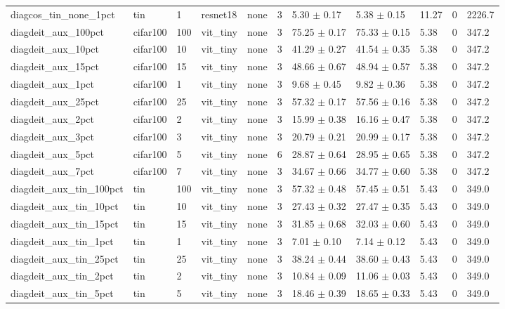 \begin{tabular}{lllllllllll}
diagcos_tin_none_1pct & tin & 1 & resnet18 & none & 3 & 5.30 $\pm$ 0.17 & 5.38 $\pm$ 0.15 & 11.27 & 0 & 2226.7 \\
diagdeit_aux_100pct & cifar100 & 100 & vit_tiny & none & 3 & 75.25 $\pm$ 0.17 & 75.33 $\pm$ 0.15 & 5.38 & 0 & 347.2 \\
diagdeit_aux_10pct & cifar100 & 10 & vit_tiny & none & 3 & 41.29 $\pm$ 0.27 & 41.54 $\pm$ 0.35 & 5.38 & 0 & 347.2 \\
diagdeit_aux_15pct & cifar100 & 15 & vit_tiny & none & 3 & 48.66 $\pm$ 0.67 & 48.94 $\pm$ 0.57 & 5.38 & 0 & 347.2 \\
diagdeit_aux_1pct & cifar100 & 1 & vit_tiny & none & 3 & 9.68 $\pm$ 0.45 & 9.82 $\pm$ 0.36 & 5.38 & 0 & 347.2 \\
diagdeit_aux_25pct & cifar100 & 25 & vit_tiny & none & 3 & 57.32 $\pm$ 0.17 & 57.56 $\pm$ 0.16 & 5.38 & 0 & 347.2 \\
diagdeit_aux_2pct & cifar100 & 2 & vit_tiny & none & 3 & 15.99 $\pm$ 0.38 & 16.16 $\pm$ 0.47 & 5.38 & 0 & 347.2 \\
diagdeit_aux_3pct & cifar100 & 3 & vit_tiny & none & 3 & 20.79 $\pm$ 0.21 & 20.99 $\pm$ 0.17 & 5.38 & 0 & 347.2 \\
diagdeit_aux_5pct & cifar100 & 5 & vit_tiny & none & 6 & 28.87 $\pm$ 0.64 & 28.95 $\pm$ 0.65 & 5.38 & 0 & 347.2 \\
diagdeit_aux_7pct & cifar100 & 7 & vit_tiny & none & 3 & 34.67 $\pm$ 0.66 & 34.77 $\pm$ 0.60 & 5.38 & 0 & 347.2 \\
diagdeit_aux_tin_100pct & tin & 100 & vit_tiny & none & 3 & 57.32 $\pm$ 0.48 & 57.45 $\pm$ 0.51 & 5.43 & 0 & 349.0 \\
diagdeit_aux_tin_10pct & tin & 10 & vit_tiny & none & 3 & 27.43 $\pm$ 0.32 & 27.47 $\pm$ 0.35 & 5.43 & 0 & 349.0 \\
diagdeit_aux_tin_15pct & tin & 15 & vit_tiny & none & 3 & 31.85 $\pm$ 0.68 & 32.03 $\pm$ 0.60 & 5.43 & 0 & 349.0 \\
diagdeit_aux_tin_1pct & tin & 1 & vit_tiny & none & 3 & 7.01 $\pm$ 0.10 & 7.14 $\pm$ 0.12 & 5.43 & 0 & 349.0 \\
diagdeit_aux_tin_25pct & tin & 25 & vit_tiny & none & 3 & 38.24 $\pm$ 0.44 & 38.60 $\pm$ 0.43 & 5.43 & 0 & 349.0 \\
diagdeit_aux_tin_2pct & tin & 2 & vit_tiny & none & 3 & 10.84 $\pm$ 0.09 & 11.06 $\pm$ 0.03 & 5.43 & 0 & 349.0 \\
diagdeit_aux_tin_5pct & tin & 5 & vit_tiny & none & 3 & 18.46 $\pm$ 0.39 & 18.65 $\pm$ 0.33 & 5.43 & 0 & 349.0 \\

\end{tabular}
